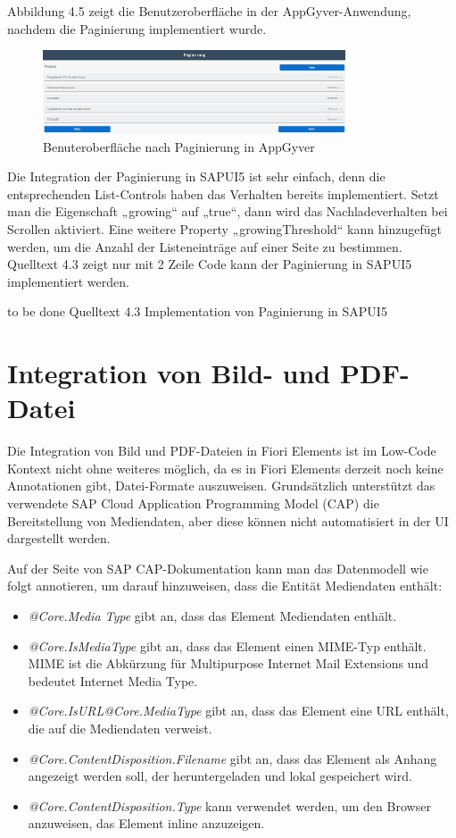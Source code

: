 Abbildung 4.5 zeigt die Benutzeroberfläche in der AppGyver-Anwendung, nachdem die Paginierung implementiert wurde.

\begin{figure}[htbp]
 \centering
 \includegraphics[width=0.8\textwidth]{Bilder/appgyver/4_5_AppGyver_pagnierung.jpg}
 \caption{Benuteroberfläche nach Paginierung in AppGyver }
\end{figure}

Die Integration der Paginierung in SAPUI5 ist sehr einfach, denn die entsprechenden List-Controls haben das Verhalten bereits implementiert. Setzt man die Eigenschaft „growing“ auf „true“, dann wird das Nachladeverhalten bei Scrollen aktiviert. Eine weitere Property „growingThreshold“ kann hinzugefügt werden, um die Anzahl der Listeneinträge auf einer Seite zu bestimmen. Quelltext 4.3 zeigt nur mit 2 Zeile Code kann der Paginierung in SAPUI5 implementiert werden.

to be done Quelltext 4.3 Implementation von Paginierung in SAPUI5

\section{Integration von Bild- und PDF-Datei}

Die Integration von Bild und PDF-Dateien in Fiori Elements ist im Low-Code Kontext nicht ohne weiteres möglich, da es in Fiori Elements derzeit noch keine Annotationen gibt, Datei-Formate auszuweisen. Grundsätzlich unterstützt das verwendete SAP Cloud Application Programming Model (CAP) die Bereitstellung von Mediendaten\cite{sapc:smd}, aber diese können nicht automatisiert in der UI dargestellt werden.

Auf der Seite von SAP CAP-Dokumentation kann man das Datenmodell wie folgt annotieren, um darauf hinzuweisen, dass die Entität Mediendaten enthält:

\begin{itemize}[noitemsep]
\item \textit{@Core.Media Type} gibt an, dass das Element Mediendaten enthält. 
\item \textit{@Core.IsMediaType} gibt an, dass das Element einen MIME-Typ enthält. MIME ist die Abkürzung für Multipurpose Internet Mail Extensions und bedeutet Internet Media Type\cite{mi:pag}.
\item \textit{@Core.IsURL@Core.MediaType} gibt an, dass das Element eine URL enthält, die auf die Mediendaten verweist.
\item \textit{@Core.ContentDisposition.Filename} gibt an, dass das Element als Anhang angezeigt werden soll, der heruntergeladen und lokal gespeichert wird.
\item \textit{@Core.ContentDisposition.Type} kann verwendet werden, um den Browser anzuweisen, das Element inline anzuzeigen.
\end{itemize}

